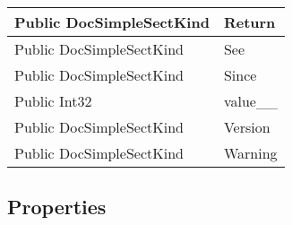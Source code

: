 \documentclass[11pt, oneside, a4paper]{book}
\begin{document}
\begin{center}
\begin{tabular}{| p{3cm} | p{12cm} | }
\hline
 Public  DocSimpleSectKind &  Return\hypertarget{SoftwareEngineeringTools.{}Documentation.{}DocSimpleSectKind.{}Return}{}\\
\hline
 Public  DocSimpleSectKind &  See\hypertarget{SoftwareEngineeringTools.{}Documentation.{}DocSimpleSectKind.{}See}{}\\
\hline
 Public  DocSimpleSectKind &  Since\hypertarget{SoftwareEngineeringTools.{}Documentation.{}DocSimpleSectKind.{}Since}{}\\
\hline
 Public  Int32 &  value\_\_\hypertarget{SoftwareEngineeringTools.{}Documentation.{}DocSimpleSectKind.{}value\_\_}{}\\
\hline
 Public  DocSimpleSectKind &  Version\hypertarget{SoftwareEngineeringTools.{}Documentation.{}DocSimpleSectKind.{}Version}{}\\
\hline
 Public  DocSimpleSectKind &  Warning\hypertarget{SoftwareEngineeringTools.{}Documentation.{}DocSimpleSectKind.{}Warning}{}\\
\hline
\end{tabular}
\end{center}

\subsection{Properties}
\end{document}
